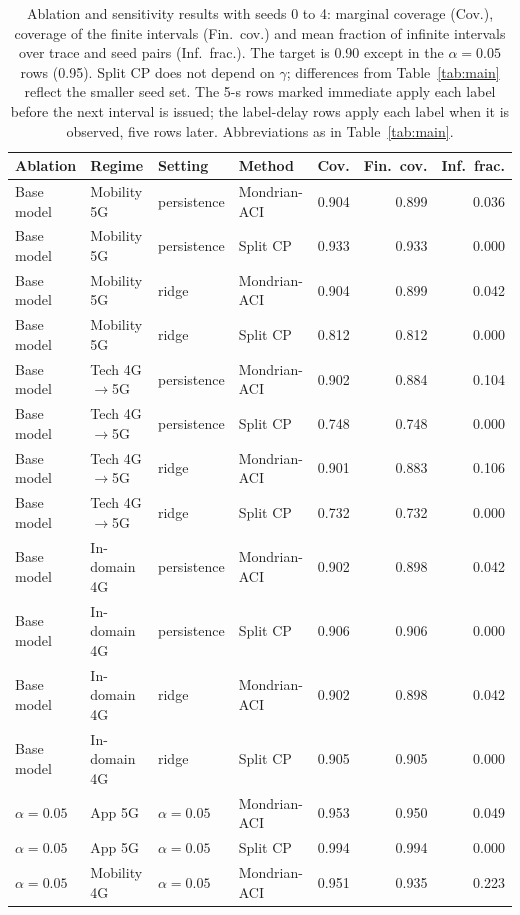 \begin{table}[!t]
\caption{Ablation and sensitivity results with seeds 0 to 4: marginal coverage (Cov.), coverage of the finite intervals (Fin.\ cov.) and mean fraction of infinite intervals over trace and seed pairs (Inf.\ frac.). The target is 0.90 except in the $\alpha=0.05$ rows (0.95). Split CP does not depend on $\gamma$; differences from Table~\ref{tab:main} reflect the smaller seed set. The 5-s rows marked immediate apply each label before the next interval is issued; the label-delay rows apply each label when it is observed, five rows later. Abbreviations as in Table~\ref{tab:main}.}
\label{tab:ablations}
\centering
\scriptsize
\setlength{\tabcolsep}{3.5pt}
\begin{tabular}{llllrrr}
\toprule
Ablation & Regime & Setting & Method & Cov. & Fin.\ cov. & Inf.\ frac. \\
\midrule
Base model & Mobility 5G & persistence & Mondrian-ACI & 0.904 & 0.899 & 0.036 \\
Base model & Mobility 5G & persistence & Split CP & 0.933 & 0.933 & 0.000 \\
Base model & Mobility 5G & ridge & Mondrian-ACI & 0.904 & 0.899 & 0.042 \\
Base model & Mobility 5G & ridge & Split CP & 0.812 & 0.812 & 0.000 \\
Base model & Tech 4G$\rightarrow$5G & persistence & Mondrian-ACI & 0.902 & 0.884 & 0.104 \\
Base model & Tech 4G$\rightarrow$5G & persistence & Split CP & 0.748 & 0.748 & 0.000 \\
Base model & Tech 4G$\rightarrow$5G & ridge & Mondrian-ACI & 0.901 & 0.883 & 0.106 \\
Base model & Tech 4G$\rightarrow$5G & ridge & Split CP & 0.732 & 0.732 & 0.000 \\
Base model & In-domain 4G & persistence & Mondrian-ACI & 0.902 & 0.898 & 0.042 \\
Base model & In-domain 4G & persistence & Split CP & 0.906 & 0.906 & 0.000 \\
Base model & In-domain 4G & ridge & Mondrian-ACI & 0.902 & 0.898 & 0.042 \\
Base model & In-domain 4G & ridge & Split CP & 0.905 & 0.905 & 0.000 \\
$\alpha=0.05$ & App 5G & $\alpha=0.05$ & Mondrian-ACI & 0.953 & 0.950 & 0.049 \\
$\alpha=0.05$ & App 5G & $\alpha=0.05$ & Split CP & 0.994 & 0.994 & 0.000 \\
$\alpha=0.05$ & Mobility 4G & $\alpha=0.05$ & Mondrian-ACI & 0.951 & 0.935 & 0.223 \\

\end{tabular}
\end{table}
